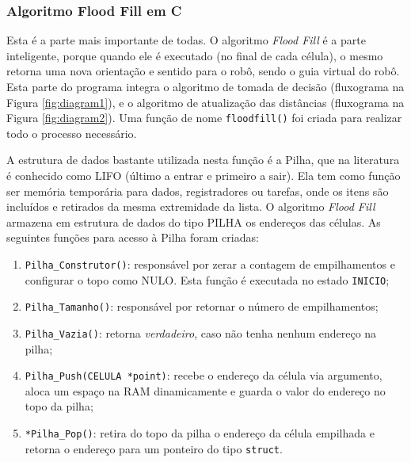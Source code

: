 %		
%        
%        
%        	

\subsubsection{Algoritmo Flood Fill em C}
Esta é a parte mais importante de todas. O algoritmo \emph{Flood Fill} é a parte inteligente, porque quando ele é executado (no final de cada célula), o mesmo retorna uma nova orientação e sentido para o robô, sendo o guia virtual do robô. Esta parte do programa integra o algoritmo de tomada de decisão (fluxograma na Figura \ref{fig:diagram1}), e o algoritmo de atualização das distâncias (fluxograma na Figura \ref{fig:diagram2}). Uma função de nome \verb+floodfill()+ foi criada para realizar todo o processo necessário.

A estrutura de dados bastante utilizada nesta função é a Pilha, que na literatura é conhecido como LIFO (último a entrar e primeiro a sair). Ela tem como função ser memória temporária para dados, registradores ou tarefas, onde os itens são incluídos e retirados da mesma extremidade da lista. O algoritmo \emph{Flood Fill} armazena em estrutura de dados do tipo PILHA os endereços das células. As seguintes funções para acesso à Pilha foram criadas:

\begin{enumerate}[leftmargin=2cm,label=\alph*)]
\item \verb+Pilha_Construtor()+: responsável por zerar a contagem de empilhamentos e configurar o topo como NULO. Esta função é executada no estado \verb+INICIO+;
\item \verb+Pilha_Tamanho()+: responsável por retornar o número de empilhamentos;
\item \verb+Pilha_Vazia()+: retorna \emph{verdadeiro}, caso não tenha nenhum endereço na pilha;
\item \verb+Pilha_Push(CELULA *point)+: recebe o endereço da célula via argumento, aloca um espaço na RAM dinamicamente e guarda o valor do endereço no topo da pilha;
\item \verb+*Pilha_Pop()+: retira do topo da pilha o endereço da célula empilhada e retorna o endereço para um ponteiro do tipo \verb+struct+.
\end{enumerate}

